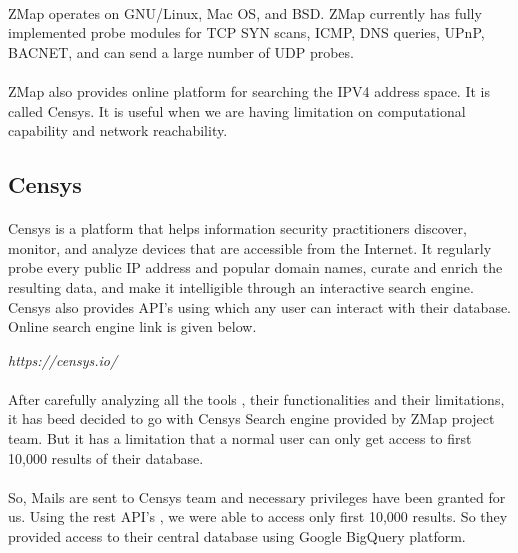 \documentclass{report}
\begin{document}
\paragraph{}
ZMap operates on GNU/Linux, Mac OS, and BSD. ZMap currently has fully implemented probe modules for TCP SYN scans, ICMP, DNS queries, UPnP, BACNET, and can send a large number of UDP probes.

\paragraph{}
ZMap also provides online platform for searching the IPV4 address space. It is called Censys. It is useful when we are having limitation on computational capability and network reachability.

\subsection{Censys}
\paragraph{}
Censys is a platform that helps information security practitioners discover, monitor, and analyze devices that are accessible from the Internet. It regularly probe every public IP address and popular domain names, curate and enrich the resulting data, and make it intelligible through an interactive search engine. Censys also provides API's using which any user can interact with their database. Online search engine link is given below.

\begin{center}
\textit{https://censys.io/}
\end{center}

\paragraph{}
After carefully analyzing all the tools , their functionalities and their limitations, it has beed decided to go with Censys Search engine provided by ZMap project team. But it has a limitation that a normal user can only get access to first 10,000 results of their database.

\paragraph{}
So, Mails are sent to Censys team and necessary privileges have been granted for us. Using the rest API's , we were able to access only first 10,000 results. So they provided access to their central database using Google BigQuery platform.
\end{document}
